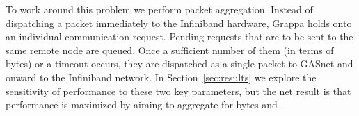 To work around this problem we perform packet aggregation.  Instead of dispatching a packet immediately to the Infiniband hardware, Grappa holds onto an individual communication request.  Pending requests that are to be sent to the same remote node are queued.  Once a sufficient number of them (in terms of bytes) or a timeout occurs, they are dispatched as a single packet to GASnet and onward to the Infiniband network.  In Section~\ref{sec:results} we explore the sensitivity of performance to these two key parameters, but the net result is that performance is maximized by aiming to aggregate for  bytes and .
